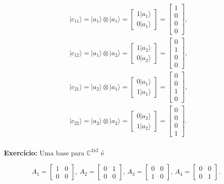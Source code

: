 \documentclass[11pt]{article}
\begin{document}
\begin{align}
& |c_{11}\rangle=|a_{1}\rangle\otimes|a_{1}\rangle=\begin{bmatrix}1|a_{1}\rangle\\0|a_{1}\rangle\end{bmatrix}=\begin{bmatrix}1\\0\\0\\0\end{bmatrix}, \\
& |c_{12}\rangle=|a_{1}\rangle\otimes|a_{2}\rangle=\begin{bmatrix}1|a_{2}\rangle\\0|a_{2}\rangle\end{bmatrix}=\begin{bmatrix}0\\1\\0\\0\end{bmatrix}, \\
& |c_{21}\rangle=|a_{2}\rangle\otimes|a_{1}\rangle=\begin{bmatrix}0|a_{1}\rangle\\1|a_{1}\rangle\end{bmatrix}=\begin{bmatrix}0\\0\\1\\0\end{bmatrix}, \\
& |c_{22}\rangle=|a_{2}\rangle\otimes|a_{2}\rangle=\begin{bmatrix}0|a_{2}\rangle\\1|a_{2}\rangle\end{bmatrix}=\begin{bmatrix}0\\0\\0\\1\end{bmatrix}. \\
\end{align}

\textbf{Exercício:} Uma base para \(\mathbb{C}^{2\mathrm{x}2}\) é

\begin{equation}
A_{1}=\begin{bmatrix}1&0\\0&0\end{bmatrix}\text{, }A_{2}=\begin{bmatrix}0&1\\0&0\end{bmatrix}\text{, }A_{3}=\begin{bmatrix}0&0\\1&0\end{bmatrix}\text{, }A_{4}=\begin{bmatrix}0&0\\0&1\end{bmatrix}.
\end{equation}
\end{document}

